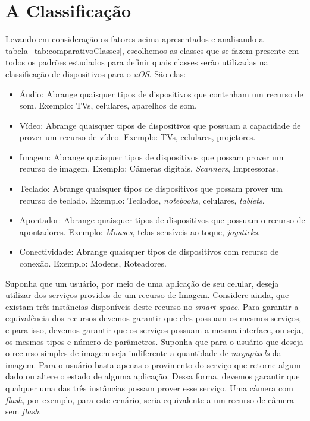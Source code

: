 \section{A Classificação}
Levando em consideração os fatores acima apresentados e analisando a tabela~\ref{tab:comparativoClasses}, escolhemos as classes que se fazem presente em todos os padrões estudados para definir quais classes serão utilizadas na classificação de dispositivos para o \emph{uOS}. São elas:

\begin{itemize}
	\item Áudio:
		Abrange quaisquer tipos de dispositivos que contenham um recurso de som. Exemplo: TVs, celulares, aparelhos de som.
	\item Vídeo:
		Abrange quaisquer tipos de dispositivos que possuam a capacidade de prover um recurso de vídeo. Exemplo: TVs, celulares, projetores.
	\item Imagem:
		Abrange quaisquer tipos de dispositivos que possam prover um recurso de imagem. Exemplo: Câmeras digitais, \emph{Scanners}, Impressoras.
	\item Teclado:
		Abrange quaisquer tipos de dispositivos que possam prover um recurso de teclado. Exemplo: Teclados, \emph{notebooks}, celulares, \emph{tablets}.
	\item Apontador:
		Abrange quaisquer tipos de dispositivos que possuam o recurso de apontadores. Exemplo: \emph{Mouses}, telas sensíveis ao toque, \emph{joysticks}.
	\item Conectividade:
		Abrange quaisquer tipos de dispositivos com recurso de conexão. Exemplo: Modens, Roteadores.
\end{itemize}

Suponha que um usuário, por meio de uma aplicação de seu celular, deseja utilizar dos serviços providos de um recurso de Imagem. Considere ainda, que existam três instâncias disponíveis deste recurso no \emph{smart space}. Para garantir a equivalência dos recursos devemos garantir que eles possuam os mesmos serviços, e para isso, devemos garantir que os serviços possuam a mesma interface, ou seja, os mesmos tipos e número de parâmetros. Suponha que para o usuário que deseja o recurso simples de imagem seja indiferente a quantidade de \emph{megapixels} da imagem. Para o usuário basta apenas o provimento do serviço que retorne algum dado ou altere o estado de alguma aplicação. Dessa forma, devemos garantir que qualquer uma das três instâncias possam prover esse serviço. Uma câmera com \emph{flash}, por exemplo, para este cenário, seria equivalente a um recurso de câmera sem \emph{flash}.



